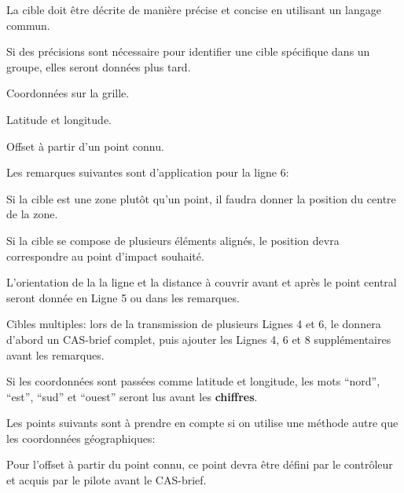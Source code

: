 \begin{e1}
{		La cible doit être décrite de manière précise et concise en utilisant un langage commun.
		
		Si des précisions sont nécessaire pour identifier une cible spécifique dans un groupe, elles seront données plus tard.
	}
	
	\begin{e2}
		
		\item Coordonnées sur la grille.
		
		\item Latitude et longitude.
		
		\item Offset à partir d'un point connu.
		
	\end{e2}
	
	Les remarques suivantes sont d'application pour la ligne 6:
	
	\begin{e2}
		
		\item Si la cible est une zone plutôt qu'un point, il faudra donner la position du centre de la zone.
		
		\item Si la cible se compose de plusieurs éléments alignés, le position devra correspondre au point d'impact souhaité.
		
		L'orientation de la la ligne et la distance à couvrir avant et après le point central seront donnée en Ligne 5 ou dans les remarques.
		
		\item Cibles multiples: lors de la transmission de plusieurs Lignes 4 et 6, le \ja{} donnera d'abord un CAS-brief complet, puis ajouter les Lignes 4, 6 et 8 supplémentaires avant les remarques.
		
		\item Si les coordonnées sont passées comme latitude et longitude, les mots ``nord'', ``est'', ``sud'' et ``ouest'' seront lus avant les \textbf{chiffres}.
		
		\item Les points suivants sont à prendre en compte si on utilise une méthode autre que les coordonnées géographiques:
		
		\begin{e3}
			
			\item Pour l'offset à partir du point connu, ce point devra être défini par le contrôleur et acquis par le pilote avant le CAS-brief.
			

\end{e3}
\end{e2}
\end{e1}
